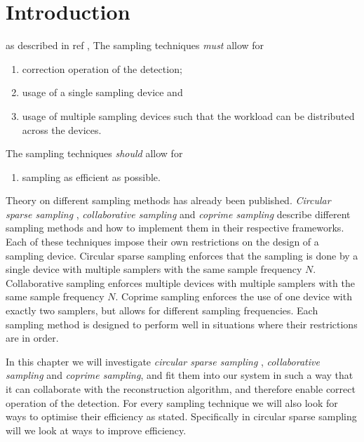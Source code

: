 \documentclass[a4paper, openany, oneside]{memoir}
\begin{document}
\section{Introduction}
as described in ref , The sampling techniques \emph{must} allow for
\begin{enumerate}
    \item correction operation of the detection;
    \item usage of a single sampling device and
    \item usage of multiple sampling devices such that the workload can be distributed across the devices.
\end{enumerate}

The sampling techniques \emph{should} allow for
\begin{enumerate}
    \item sampling as efficient as possible.
\end{enumerate}

Theory on different sampling methods has already been published. \textit{Circular sparse sampling} \cite{ariananda2012compressive}, \textit{collaborative sampling} \cite{ariananda2014cooperative} and \textit{coprime sampling} \cite{pal2011coprime} describe different sampling methods and how to implement them in their respective frameworks. Each of these techniques impose their own restrictions on the design of a sampling device. Circular sparse sampling enforces that the sampling is done by a single device with multiple samplers with the same sample frequency $N$. Collaborative sampling enforces multiple devices with multiple samplers with the same sample frequency $N$. Coprime sampling enforces the use of one device with exactly two samplers, but allows for different sampling frequencies. Each sampling method is designed to perform well in situations where their restrictions are in order.

In this chapter we will investigate \textit{circular sparse sampling} , \textit{collaborative sampling} and \textit{coprime sampling}, and fit them into our system in such a way that it can collaborate with the reconstruction algorithm, and therefore enable correct operation of the detection. For every sampling technique we will also look for ways to optimise their efficiency as stated. Specifically in circular sparse sampling will we look at ways to improve efficiency.
\end{document}
